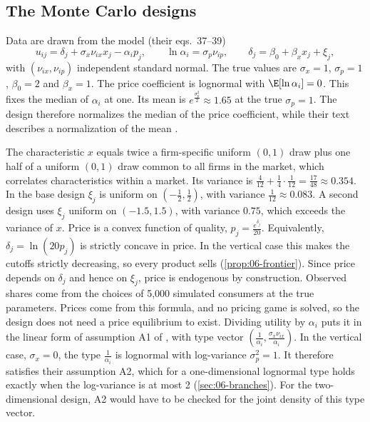 \subsection{The Monte Carlo designs}\label{sec:06-bp-design}

Data are drawn from the model (their eqs.~37--39)
\begin{equation}\label{eq:06-bp-mc}
  u_{ij} = \delta_j + \sigma_x \nu_{ix} x_j - \alpha_i p_j , \qquad
  \ln \alpha_i = \sigma_p \nu_{ip} , \qquad
  \delta_j = \beta_0 + \beta_x x_j + \xi_j ,
\end{equation}
with $(\nu_{ix}, \nu_{ip})$ independent standard normal. The true values are $\sigma_x = 1$, $\sigma_p = 1$, $\beta_0 = 2$ and
$\beta_x = 1$. The price coefficient is lognormal with $\E[\ln \alpha_i] = 0$. This fixes the median of $\alpha_i$ at
one. Its mean is $e^{\frac{\sigma_p^2}{2}} \approx 1.65$ at the true $\sigma_p = 1$. The design therefore normalizes the
median of the price coefficient, while their text describes a normalization of the mean
\citep[p.~11]{BerryPakes2007}.

The characteristic $x$ equals twice a firm-specific uniform $(0,1)$ draw plus one half of a uniform $(0,1)$ draw common to
all firms in the market, which correlates characteristics within a market. Its variance is $\frac{4}{12} + \frac{1}{4}
\cdot \frac{1}{12} = \frac{17}{48} \approx 0.354$. In the base design $\xi_j$ is uniform on $(-\frac{1}{2}, \frac{1}{2})$,
with variance $\frac{1}{12} \approx 0.083$. A second design uses $\xi_j$ uniform on $(-1.5, 1.5)$, with variance $0.75$, which
exceeds the variance of $x$. Price is a convex function of quality, $p_j = \frac{e^{\delta_j}}{20}$. Equivalently, $\delta_j
= \ln(20 p_j)$ is strictly concave in price. In the vertical case this makes the cutoffs strictly decreasing, so every
product sells (\cref{prop:06-frontier}). Since price depends on $\delta_j$ and hence on $\xi_j$, price is endogenous by
construction. Observed shares come from the choices of 5,000 simulated consumers at the true parameters. Prices come
from this formula, and no pricing game is solved, so the design does not need a price equilibrium to exist.
Dividing utility by $\alpha_i$ puts it in the linear form of assumption A1 of \citet{CaplinNalebuff1991}, with type
vector $(\frac{1}{\alpha_i}, \frac{\sigma_x \nu_{ix}}{\alpha_i})$. In the vertical case, $\sigma_x = 0$, the type
$\frac{1}{\alpha_i}$ is lognormal with log-variance $\sigma_p^2 = 1$. It therefore satisfies their assumption A2, which for a
one-dimensional lognormal type holds exactly when the log-variance is at most 2 (\cref{sec:06-branches}). For the
two-dimensional design, A2 would have to be checked for the joint density of this type vector.


